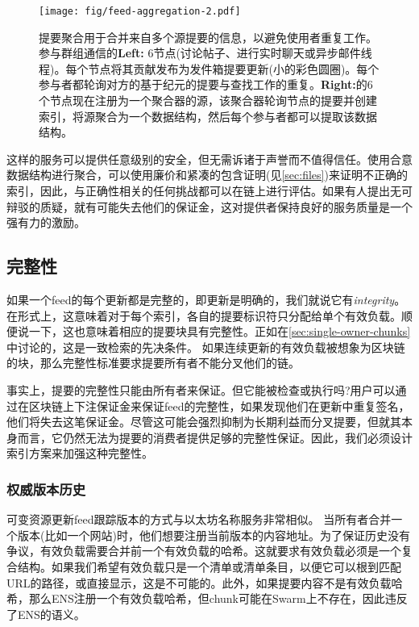 \begin{figure}[htbp]
\centering
\texttt{[image: fig/feed-aggregation-2.pdf]}
\caption[提要聚合\statusyellow]{提要聚合用于合并来自多个源提要的信息，以避免使用者重复工作。参与群组通信的\textbf{Left:} 6节点(讨论帖子、进行实时聊天或异步邮件线程)。每个节点将其贡献发布为发件箱提要更新(小的彩色圆圈)。每个参与者都轮询对方的基于纪元的提要与查找工作的重复。\textbf{Right:}的6个节点现在注册为一个聚合器的源，该聚合器轮询节点的提要并创建索引，将源聚合为一个数据结构，然后每个参与者都可以提取该数据结构。}
\label{fig:feed-aggregation}
\end{figure}

这样的服务可以提供任意级别的安全，但无需诉诸于声誉而不值得信任。使用合意数据结构进行聚合，可以使用廉价和紧凑的包含证明(见\ref{sec:files})来证明不正确的索引，因此，与正确性相关的任何挑战都可以在链上进行评估。如果有人提出无可辩驳的质疑，就有可能失去他们的保证金，这对提供者保持良好的服务质量是一个强有力的激励。

\subsection{完整性\statusyellow}\label{sec:feed-integrity}

如果一个feed的每个更新都是完整的，即更新是明确的，我们就说它有\emph{integrity}。在形式上，这意味着对于每个索引，各自的提要标识符只分配给单个有效负载。顺便说一下，这也意味着相应的提要块具有完整性。正如在\ref{sec:single-owner-chunks}中讨论的，这是一致检索的先决条件。 
如果连续更新的有效负载被想象为区块链的块，那么完整性标准要求提要所有者不能分叉他们的链。

事实上，提要的完整性只能由所有者来保证。但它能被检查或执行吗?用户可以通过在区块链上下注保证金来保证feed的完整性，如果发现他们在更新中重复签名，他们将失去这笔保证金。尽管这可能会强烈抑制为长期利益而分叉提要，但就其本身而言，它仍然无法为提要的消费者提供足够的完整性保证。因此，我们必须设计索引方案来加强这种完整性。

\subsubsection{权威版本历史}

可变资源更新feed跟踪版本的方式与以太坊名称服务非常相似。
当所有者合并一个版本(比如一个网站)时，他们想要注册当前版本的内容地址。为了保证历史没有争议，有效负载需要合并前一个有效负载的哈希。这就要求有效负载必须是一个复合结构。如果我们希望有效负载只是一个清单或清单条目，以便它可以根到匹配URL的路径，或直接显示，这是不可能的。此外，如果提要内容不是有效负载哈希，那么ENS注册一个有效负载哈希，但chunk可能在Swarm上不存在，因此违反了ENS的语义。

